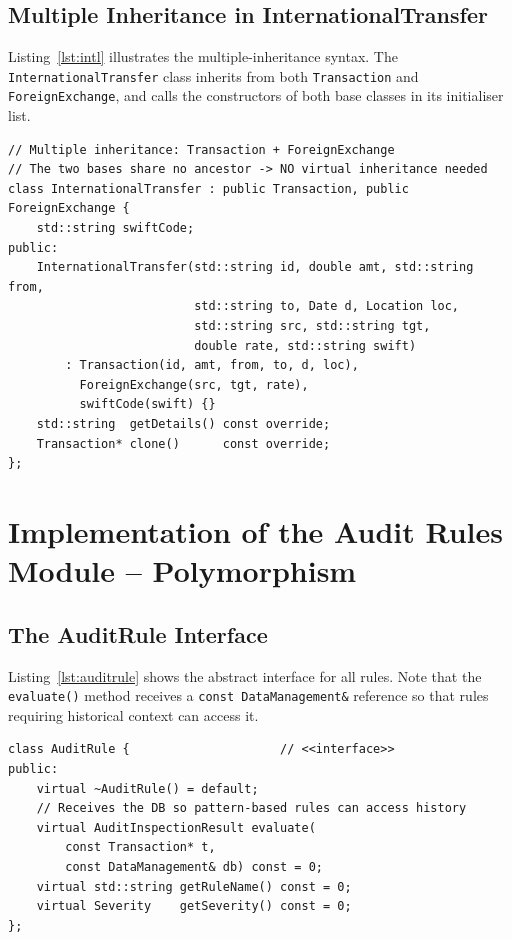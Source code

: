     \subsection{Multiple Inheritance in InternationalTransfer}
    Listing~\ref{lst:intl} illustrates the multiple-inheritance syntax. The \texttt{InternationalTransfer} class inherits from both \texttt{Transaction} and \texttt{ForeignExchange}, and calls the constructors of both base classes in its initialiser list.

\begin{lstlisting}[caption={Multiple inheritance in InternationalTransfer}, label={lst:intl}]
// Multiple inheritance: Transaction + ForeignExchange
// The two bases share no ancestor -> NO virtual inheritance needed
class InternationalTransfer : public Transaction, public ForeignExchange {
    std::string swiftCode;
public:
    InternationalTransfer(std::string id, double amt, std::string from,
                          std::string to, Date d, Location loc,
                          std::string src, std::string tgt,
                          double rate, std::string swift)
        : Transaction(id, amt, from, to, d, loc),
          ForeignExchange(src, tgt, rate),
          swiftCode(swift) {}
    std::string  getDetails() const override;
    Transaction* clone()      const override;
};
\end{lstlisting}

\section{Implementation of the Audit Rules Module -- Polymorphism}
    \subsection{The AuditRule Interface}
    Listing~\ref{lst:auditrule} shows the abstract interface for all rules. Note that the \texttt{evaluate()} method receives a \texttt{const DataManagement\&} reference so that rules requiring historical context can access it.

\begin{lstlisting}[caption={The abstract AuditRule interface}, label={lst:auditrule}]
class AuditRule {                     // <<interface>>
public:
    virtual ~AuditRule() = default;
    // Receives the DB so pattern-based rules can access history
    virtual AuditInspectionResult evaluate(
        const Transaction* t,
        const DataManagement& db) const = 0;
    virtual std::string getRuleName() const = 0;
    virtual Severity    getSeverity() const = 0;
};
\end{lstlisting}

